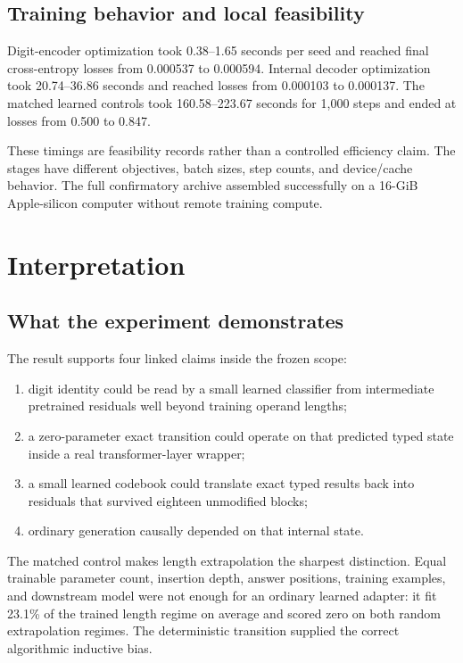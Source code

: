 \documentclass[11pt]{article}
\begin{document}
\subsection{Training behavior and local feasibility}

Digit-encoder optimization took 0.38--1.65 seconds per seed and reached final
cross-entropy losses from 0.000537 to 0.000594. Internal decoder optimization
took 20.74--36.86 seconds and reached losses from 0.000103 to 0.000137.
The matched learned controls took 160.58--223.67 seconds for 1,000 steps and
ended at losses from 0.500 to 0.847.

These timings are feasibility records rather than a controlled efficiency
claim. The stages have different objectives, batch sizes, step counts, and
device/cache behavior. The full confirmatory archive assembled successfully
on a 16-GiB Apple-silicon computer without remote training compute.

\section{Interpretation}

\subsection{What the experiment demonstrates}

The result supports four linked claims inside the frozen scope:

\begin{enumerate}
  \item digit identity could be read by a small learned classifier from
  intermediate pretrained residuals well beyond training operand lengths;
  \item a zero-parameter exact transition could operate on that predicted
  typed state inside a real transformer-layer wrapper;
  \item a small learned codebook could translate exact typed results back into
  residuals that survived eighteen unmodified blocks;
  \item ordinary generation causally depended on that internal state.
\end{enumerate}

The matched control makes length extrapolation the sharpest distinction.
Equal trainable parameter count, insertion depth, answer positions, training
examples, and downstream model were not enough for an ordinary learned
adapter: it fit 23.1\% of the trained length regime on average and scored zero
on both random extrapolation regimes. The deterministic transition supplied
the correct algorithmic inductive bias.
\end{document}
